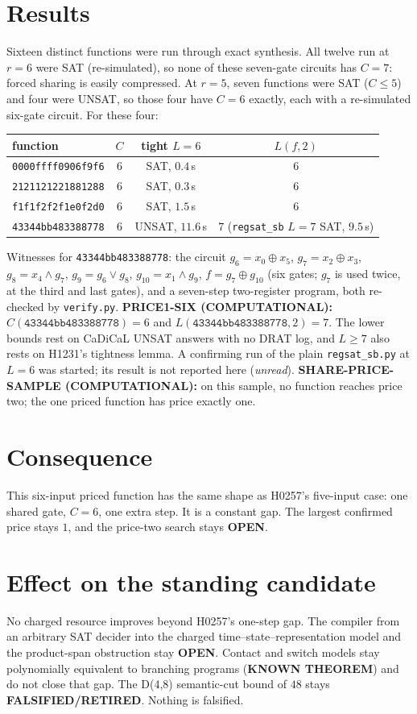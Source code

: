 \documentclass[11pt]{article}
\begin{document}
\section*{Results}
Sixteen distinct functions were run through exact synthesis. All twelve run at $r=6$ were SAT (re-simulated), so none of these seven-gate circuits has $C=7$: forced sharing is easily compressed. At $r=5$, seven functions were SAT ($C\le5$) and four were UNSAT, so those four have $C=6$ exactly, each with a re-simulated six-gate circuit. For these four:
\begin{center}\small
\begin{tabular}{lccc}
function & $C$ & tight $L=6$ & $L(f,2)$\\\hline
\texttt{0000ffff0906f9f6} & $6$ & SAT, $0.4$\,s & $6$\\
\texttt{2121121221881288} & $6$ & SAT, $0.3$\,s & $6$\\
\texttt{f1f1f2f2f1e0f2d0} & $6$ & SAT, $1.5$\,s & $6$\\
\texttt{43344bb483388778} & $6$ & UNSAT, $11.6$\,s & $7$ (\texttt{regsat\_sb} $L=7$ SAT, $9.5$\,s)\\
\end{tabular}
\end{center}
Witnesses for \texttt{43344bb483388778}: the circuit $g_6=x_0\oplus x_5$, $g_7=x_2\oplus x_3$, $g_8=x_4\wedge g_7$, $g_9=g_6\vee g_8$, $g_{10}=x_1\wedge g_9$, $f=g_7\oplus g_{10}$ (six gates; $g_7$ is used twice, at the third and last gates), and a seven-step two-register program, both re-checked by \texttt{verify.py}.
\textbf{PRICE1-SIX (COMPUTATIONAL):} $C(\texttt{43344bb483388778})=6$ and $L(\texttt{43344bb483388778},2)=7$. The lower bounds rest on CaDiCaL UNSAT answers with no DRAT log, and $L\ge7$ also rests on H1231's tightness lemma. A confirming run of the plain \texttt{regsat\_sb.py} at $L=6$ was started; its result is not reported here (\emph{unread}).
\textbf{SHARE-PRICE-SAMPLE (COMPUTATIONAL):} on this sample, no function reaches price two; the one priced function has price exactly one.
\section*{Consequence}
This six-input priced function has the same shape as H0257's five-input case: one shared gate, $C=6$, one extra step. It is a constant gap. The largest confirmed price stays $1$, and the price-two search stays \textbf{OPEN}.
\section*{Effect on the standing candidate}
No charged resource improves beyond H0257's one-step gap. The compiler from an arbitrary SAT decider into the charged time--state--representation model and the product-span obstruction stay \textbf{OPEN}. Contact and switch models stay polynomially equivalent to branching programs (\textbf{KNOWN THEOREM}) and do not close that gap. The D(4,8) semantic-cut bound of $48$ stays \textbf{FALSIFIED/RETIRED}. Nothing is falsified.
\end{document}
